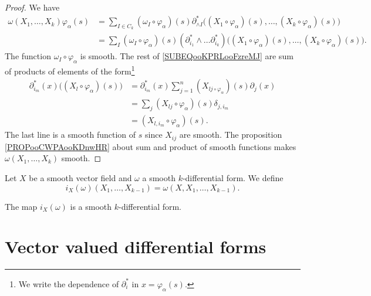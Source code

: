 \begin{proof}
	We have
	\begin{subequations}
		\begin{align}
			\omega(X_1,\ldots,X_k)\varphi_{\alpha}(s) & =\sum_{I\in C_k}(\omega_I\circ\varphi_{\alpha})(s)\partial_{\wedge I}^*\Big( (X_1\circ\varphi_{\alpha})(s),\ldots,(X_k\circ \varphi_{\alpha})(s) \Big)                                               \\
			                                          & =\sum_I(\omega_I\circ\varphi_{\alpha})(s)(\partial^*_{i_1}\wedge\ldots\partial_{i_k}^*)  \Big( (X_1\circ\varphi_{\alpha})(s),\ldots,(X_k\circ \varphi_{\alpha})(s) \Big).		\label{SUBEQooKPRLooFzreMJ}
		\end{align}
	\end{subequations}
	The function \( \omega_I\circ\varphi_{\alpha}\) is smooth. The rest of \eqref{SUBEQooKPRLooFzreMJ} are sum of products of elements of the form\footnote{We write the dependence of \( \partial_i^*\) in \( x=\varphi_{\alpha}(s)\).}
	\begin{subequations}
		\begin{align}
			\partial_{i_m}^*(x)\Big( (X_l\circ\varphi_{\alpha})(s) \Big) & = \partial^*_{i_m}(x)\sum_{j=1}^n(X_{lj\circ\varphi_{\alpha}})(s)\partial_j(x) \\
			                                                             & = \sum_j (X_{lj}\circ \varphi_{\alpha})(s)\delta_{j,i_m}                       \\
			                                                             & = (X_{l,i_m}\circ\varphi_{\alpha})(s).
		\end{align}
	\end{subequations}
	The last line is a smooth function of \( s\) since \( X_{ij}\) are smooth. The proposition \ref{PROPooCWPAooKDnwHR} about sum and product of smooth functions makes \( \omega(X_1,\ldots,X_k)\) smooth.
\end{proof}


\begin{propositionDef}
	Let \( X\) be a smooth vector field and \( \omega\) a smooth \( k\)-differential form. We define
	\begin{equation}
		i_X(\omega)(X_1,\ldots,X_{k-1})=\omega(X,X_1,\ldots,X_{k-1}).
	\end{equation}

	The map \( i_X(\omega)\) is a smooth \( k\)-differential form.
\end{propositionDef}


\section{Vector valued differential forms}	\label{SecVectValFiffFor}

